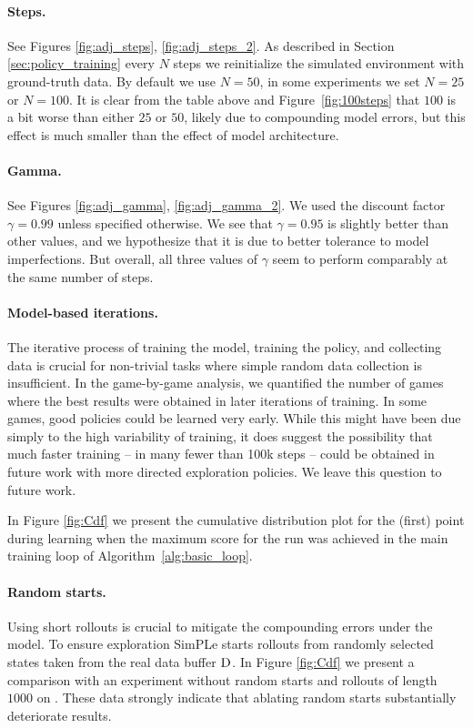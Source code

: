\paragraph{Steps.} See Figures \ref{fig:adj_steps}, \ref{fig:adj_steps_2}. As described in Section \ref{sec:policy_training} every $N$ steps we reinitialize the simulated environment with ground-truth data. By default we use $N=50$, in some experiments 
we set $N=25$ or $N=100$. It is clear from the table above and Figure~\ref{fig:100steps} that $100$ is a bit worse than either $25$ or $50$, likely due to compounding model errors,
but this effect is much smaller than the effect of model architecture.

\paragraph{Gamma.} See Figures \ref{fig:adj_gamma}, \ref{fig:adj_gamma_2}. We used the discount factor $\gamma=0.99$ unless specified otherwise.  We see that $\gamma=0.95$ is slightly better than other values, and we hypothesize that it is due to better tolerance to model imperfections. But overall, all three values of $\gamma$ seem to perform comparably at the same number of steps.

\paragraph{Model-based iterations.}
The iterative process of training the model, training the policy, and collecting data is crucial for non-trivial tasks where simple random data collection is insufficient. In the game-by-game analysis, we quantified the number of games where the best results were obtained in later iterations of training. In some games, good policies could be learned very early. While this might have been due simply to the high variability of training, it does suggest the possibility that much faster training -- in many fewer than 100k steps -- could be obtained in future work with more directed exploration policies. We leave this question to future work.

In Figure \ref{fig:Cdf} we present the cumulative distribution plot for the (first) point during learning when the maximum score for the run was achieved in the main training loop of Algorithm~\ref{alg:basic_loop}.

\paragraph{Random starts.} Using short rollouts is crucial to mitigate the compounding errors under the model. To ensure exploration SimPLe starts rollouts from randomly selected states taken from the real data buffer $\textsc{D}$. In Figure \ref{fig:Cdf} we present a comparison with an experiment without random starts and rollouts of length $1000$ on \seaquest. These data strongly indicate that ablating random starts substantially deteriorate results.  

